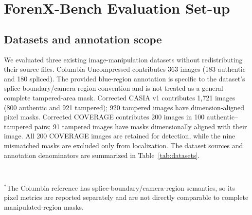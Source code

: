\section{ForenX-Bench Evaluation Set-up}
\FloatBarrier

\subsection{Datasets and annotation scope}
We evaluated three existing image-manipulation datasets without redistributing their source files. Columbia Uncompressed contributes 363 images (183 authentic and 180 spliced). The provided blue-region annotation is specific to the dataset's splice-boundary/camera-region convention and is not treated as a general complete tampered-area mask. Corrected CASIA v1 contributes 1,721 images (800 authentic and 921 tampered); 920 tampered images have dimension-aligned pixel masks. Corrected COVERAGE contributes 200 images in 100 authentic--tampered pairs; 91 tampered images have masks dimensionally aligned with their image. All 200 COVERAGE images are retained for detection, while the nine mismatched masks are excluded only from localization. The dataset sources and annotation denominators are summarized in Table~\ref{tab:datasets}.

\begin{table}[t]
\centering
\caption{Evaluation data and valid annotation scope. Counts refer to the corrected local dataset bundles used in this study. Columbia reference annotations have dataset-specific semantics and must not be interpreted as complete manipulation masks.}
\label{tab:datasets}
\small
{}
\\[0.25em]
\parbox{\linewidth}{\footnotesize $^*$The Columbia reference has splice-boundary/camera-region semantics, so its pixel metrics are reported separately and are not directly comparable to complete manipulated-region masks.}
\end{table}


